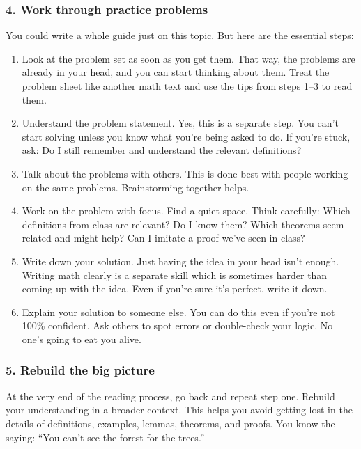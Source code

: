 \documentclass[paper=a4, fontsize=12pt]{scrartcl} %
\begin{document}
\subsubsection*{4. Work through practice problems}

You could write a whole guide just on this topic. But here are the essential steps:

\begin{enumerate}[label=\alph*]
\item Look at the problem set as soon as you get them. \newline That way, the problems are already in your head, and you can start thinking about them. Treat the problem sheet like another math text and use the tips from steps 1–3 to read them.
\item Understand the problem statement. \newline Yes, this is a separate step. You can’t start solving unless you know what you’re being asked to do. If you’re stuck, ask: Do I still remember and understand the relevant definitions?
\item Talk about the problems with others. \newline This is done best with people working on the same problems. Brainstorming together helps.
\item Work on the problem with focus. \newline Find a quiet space. Think carefully: Which definitions from class are relevant? Do I know them? Which theorems seem related and might help? Can I imitate a proof we've seen in class?
\item Write down your solution. \newline Just having the idea in your head isn’t enough. Writing math clearly is a separate skill which is sometimes harder than coming up with the idea. Even if you’re sure it’s perfect, write it down.
\item Explain your solution to someone else. \newline You can do this even if you’re not 100\% confident. Ask others to spot errors or double-check your logic. No one’s going to eat you alive.  
\end{enumerate}

\subsubsection*{5. Rebuild the big picture}

At the very end of the reading process, go back and repeat step one. Rebuild your understanding in a broader context. This helps you avoid getting lost in the details of definitions, examples, lemmas, theorems, and proofs. You know the saying: “You can’t see the forest for the trees.”
\end{document}
